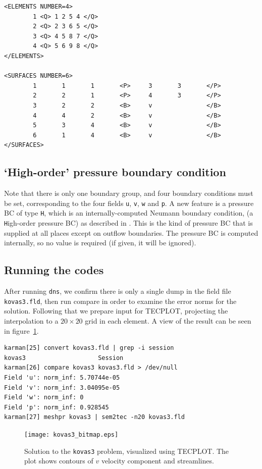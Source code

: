 \documentclass[11pt,a4paper]{report}
\begin{document}
{\begin{verbatim}
<ELEMENTS NUMBER=4>
        1 <Q> 1 2 5 4 </Q>
        2 <Q> 2 3 6 5 </Q>
        3 <Q> 4 5 8 7 </Q>
        4 <Q> 5 6 9 8 </Q>
</ELEMENTS>

<SURFACES NUMBER=6>
        1       1       1       <P>     3       3       </P>
        2       2       1       <P>     4       3       </P>
        3       2       2       <B>     v               </B>
        4       4       2       <B>     v               </B>
        5       3       4       <B>     v               </B>
        6       1       4       <B>     v               </B>
</SURFACES>
\end{verbatim}
}

\subsection{`High-order' pressure boundary condition}

Note that there is only one boundary group, and four boundary
conditions must be set, corresponding to the four fields \verb+u+,
\verb+v+, \verb+w+ and \verb+p+.  A new feature is a pressure BC of
type \verb+H+, which is an internally-computed Neumann boundary
condition, (a \verb+H+igh-order pressure BC) as described in
\citet{kio91}.  This is the kind of pressure BC that is supplied at
all places except on outflow boundaries.  The pressure BC is computed
internally, so no value is required (if given, it will be ignored).

\subsection{Running the codes}

After running \verb+dns+, we confirm there is only a single dump in the
field file \verb+kovas3.fld+, then run compare in order to examine the
error norms for the solution.  Following that we prepare input for
TECPLOT, projecting the interpolation to a $20\times20$ grid in each
element.  A view of the result can be seen in figure~\ref{kov3soln}.
{\small
\begin{verbatim}
karman[25] convert kovas3.fld | grep -i session
kovas3                    Session
karman[26] compare kovas3 kovas3.fld > /dev/null
Field 'u': norm_inf: 5.70744e-05
Field 'v': norm_inf: 3.04095e-05
Field 'w': norm_inf: 0
Field 'p': norm_inf: 0.928545
karman[27] meshpr kovas3 | sem2tec -n20 kovas3.fld
\end{verbatim}
}
\begin{figure}
\begin{center}
\texttt{[image: kovas3\_bitmap.eps]}
\end{center}
\caption{
\label{kov3soln}
  Solution to the \texttt{kovas3} problem, visualized using TECPLOT.
  The plot shows contours of $v$ velocity component and streamlines.
  }
\end{figure}
\end{document}
